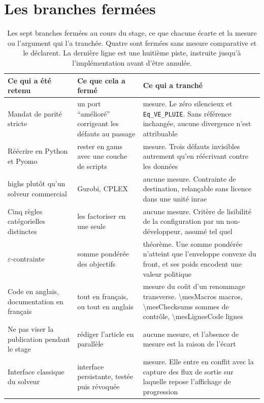 \section{Les branches fermées}

\begin{table}[H]
  \centering
  \caption{Les sept branches fermées au cours du stage, ce que chacune écarte et la mesure ou
  l'argument qui l'a tranchée. Quatre sont fermées sans mesure comparative et le déclarent.
  La dernière ligne est une huitième piste, instruite jusqu'à l'implémentation avant d'être
  annulée.}
  \label{tab:ann-branches}
  \scriptsize
  \begin{tabularx}{\textwidth}{@{}>{\raggedright\arraybackslash}p{36mm}
                               >{\raggedright\arraybackslash}p{34mm}X@{}}
    \toprule
    \textbf{Ce qui a été retenu} & \textbf{Ce que cela a fermé} & \textbf{Ce qui a tranché} \\
    \midrule
    Mandat de parité stricte & un port \enquote{amélioré} corrigeant les défauts au passage &
      mesure. Le zéro silencieux et \texttt{Eq\_VE\_PLUIE}. Sans référence inchangée, aucune
      divergence n'est attribuable \\
    Réécrire en Python et Pyomo & rester en \gls{gams} avec une couche de scripts &
      mesure. Trois défauts invisibles autrement qu'en réécrivant contre les données \\
    \gls{highs} plutôt qu'un solveur commercial & Gurobi, CPLEX &
      aucune mesure. Contrainte de destination, relançable sans licence dans une unité
      \gls{inrae} \\
    Cinq règles catégorielles distinctes & les factoriser en une seule &
      aucune mesure. Critère de lisibilité de la configuration par un non-développeur, assumé
      tel quel \\
    $\varepsilon$-contrainte & somme pondérée des objectifs &
      théorème. Une somme pondérée n'atteint que l'enveloppe convexe du front, et ses poids
      encodent une valeur politique \\
    Code en anglais, documentation en français & tout en français, ou tout en anglais &
      mesure du coût d'un renommage transverse. \num{\mesMacros} macros,
      \num{\mesChecksums} sommes de contrôle, \num{\mesLignesCode} lignes \\
    Ne pas viser la publication pendant le stage & rédiger l'article en parallèle &
      aucune mesure, et l'absence de mesure est la raison de l'écart \\
    \midrule
    Interface classique du solveur & interface persistante, testée puis révoquée &
      mesure. Elle entre en conflit avec la capture des flux de sortie sur laquelle repose
      l'affichage de progression \\
    \bottomrule
  \end{tabularx}
\end{table}
